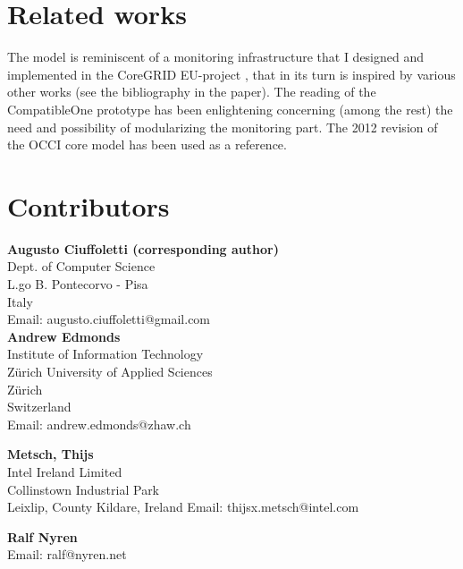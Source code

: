 \documentclass[12pt]{article}  %
\begin{document}
\section{Related works}

The model is reminiscent of a monitoring infrastructure that I designed and implemented in the CoreGRID EU-project \cite{cur:08:a}, that in its turn is inspired by various other works (see the bibliography in the paper). The reading of the CompatibleOne prototype \cite{mar12a} has been enlightening concerning (among the rest) the need and possibility of modularizing the monitoring part. The 2012 revision of the OCCI core model \cite{occi:core} has been used as a reference.





\section{Contributors}

\textbf{Augusto Ciuffoletti (corresponding author)} \\
Dept. of Computer Science \\
L.go B. Pontecorvo - Pisa\\
Italy \\
Email: augusto.ciuffoletti@gmail.com \\

\textbf{Andrew Edmonds}\\
Institute of Information Technology \\
Zürich University of Applied Sciences \\
Zürich \\
Switzerland \\
Email: andrew.edmonds@zhaw.ch

\textbf{Metsch, Thijs} \\
Intel Ireland Limited \\
Collinstown Industrial Park \\
Leixlip, County Kildare, Ireland
Email: thijsx.metsch@intel.com

\textbf{Ralf Nyren} \\
Email: ralf@nyren.net 


\end{document}
